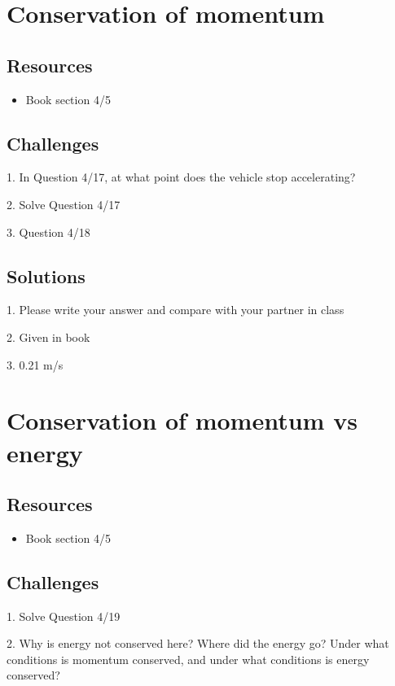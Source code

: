 \newpage
\section{Conservation of momentum}

\subsection*{Resources}
\begin{itemize}
    \item Book section 4/5
\end{itemize}

\subsection*{Challenges}
1. In Question 4/17, at what point does the vehicle stop accelerating?

2. Solve Question 4/17

3. Question 4/18

\subsection*{Solutions}
1. Please write your answer and compare with your partner in class

2. Given in book

3. 0.21 m/s




\newpage
\section{Conservation of momentum vs energy}

\subsection*{Resources}
\begin{itemize}
    \item Book section 4/5
\end{itemize}

\subsection*{Challenges}
1. Solve Question 4/19

2. Why is energy not conserved here? Where did the energy go? Under what conditions is momentum conserved, and under what conditions is energy conserved?

